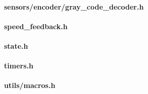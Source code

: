 \paragraph{sensors/encoder/gray\_code\_decoder.h}
\label{module_sensors_encoder_gray_code_decoder}




\paragraph{speed\_feedback.h}
\label{module_speed_feedback}



\paragraph{state.h}
\label{module_state}



\paragraph{timers.h}
\label{module_timers}



\paragraph{utils/macros.h}
\label{module_macros}


